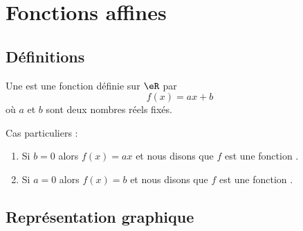 
\section{Fonctions affines}

\subsection{Définitions}

\begin{definition}
    Une  est une fonction définie sur \( \eR\) par
    \begin{equation}
        f(x)=ax+b
    \end{equation}
    où \( a\) et \( b\) sont deux nombres réels fixés.
\end{definition}

Cas particuliers :
\begin{enumerate}
    \item
        Si \( b=0\) alors \( f(x)=ax\) et nous disons que \( f\) est une fonction .
    \item
        Si \( a=0\) alors \( f(x)=b\) et nous disons que \( f\) est une fonction .
\end{enumerate}

\subsection{Représentation graphique}

